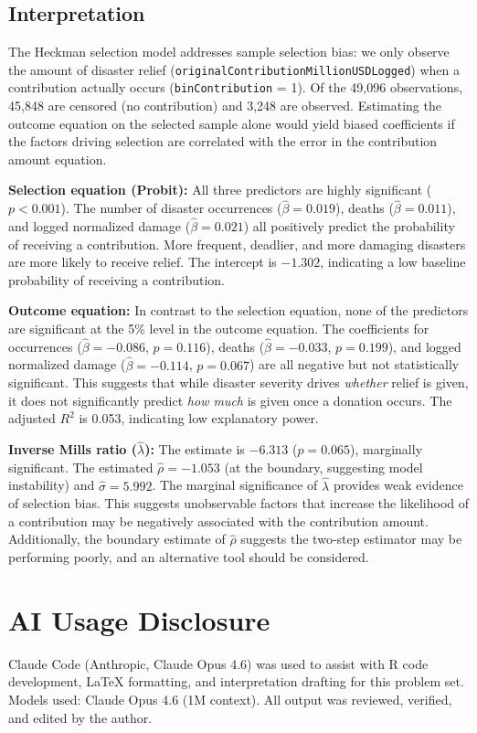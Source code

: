 \documentclass[12pt,letterpaper]{article}
\begin{document}
\subsection*{Interpretation}

The Heckman selection model addresses sample selection bias: we only observe the amount of disaster relief (\texttt{originalContributionMillionUSDLogged}) when a contribution actually occurs (\texttt{binContribution} = 1). Of the 49,096 observations, 45,848 are censored (no contribution) and 3,248 are observed. Estimating the outcome equation on the selected sample alone would yield biased coefficients if the factors driving selection are correlated with the error in the contribution amount equation.

\textbf{Selection equation (Probit):} All three predictors are highly significant ($p < 0.001$). The number of disaster occurrences ($\hat{\beta} = 0.019$), deaths ($\hat{\beta} = 0.011$), and logged normalized damage ($\hat{\beta} = 0.021$) all positively predict the probability of receiving a contribution. More frequent, deadlier, and more damaging disasters are more likely to receive relief. The intercept is $-1.302$, indicating a low baseline probability of receiving a contribution.

\textbf{Outcome equation:} In contrast to the selection equation, none of the predictors are significant at the 5\% level in the outcome equation. The coefficients for occurrences ($\hat{\beta} = -0.086$, $p = 0.116$), deaths ($\hat{\beta} = -0.033$, $p = 0.199$), and logged normalized damage ($\hat{\beta} = -0.114$, $p = 0.067$) are all negative but not statistically significant. This suggests that while disaster severity drives \textit{whether} relief is given, it does not significantly predict \textit{how much} is given once a donation occurs. The adjusted $R^2$ is 0.053, indicating low explanatory power.

\textbf{Inverse Mills ratio ($\hat{\lambda}$):} The estimate is $-6.313$ ($p = 0.065$), marginally significant. The estimated $\hat{\rho} = -1.053$ (at the boundary, suggesting model instability) and $\hat{\sigma} = 5.992$. The marginal significance of $\hat{\lambda}$ provides weak evidence of selection bias.  This suggests unobservable factors that increase the likelihood of a contribution may be negatively associated with the contribution amount. Additionally, the boundary estimate of $\hat{\rho}$ suggests the two-step estimator may be performing poorly, and an alternative tool should be considered.


\vspace{1cm}
\section*{AI Usage Disclosure}
Claude Code (Anthropic, Claude Opus 4.6) was used to assist with R code development, \LaTeX{} formatting, and interpretation drafting for this problem set. Models used: Claude Opus 4.6 (1M context). All output was reviewed, verified, and edited by the author.
\end{document}

